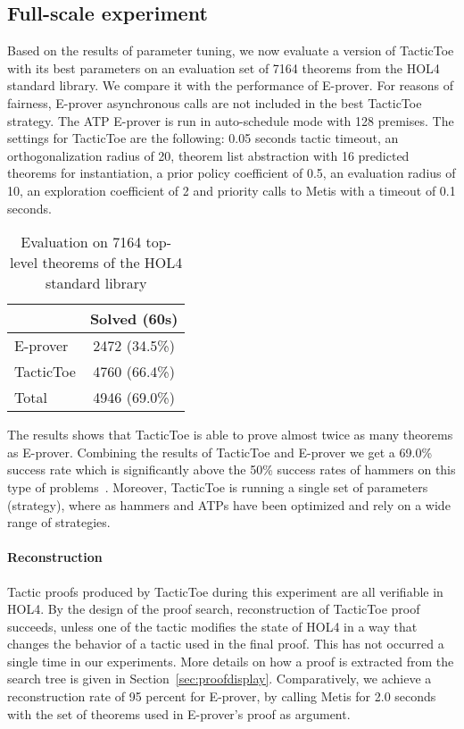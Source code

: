 \documentclass[runningheads,a4paper,draft]{svjour3}
\def\holfour{\textsf{HOL4}\xspace}
\def\eprover{\textsf{E-prover}\xspace}
\def\metis{\textsf{Metis}\xspace}
\def\tactictoe{\textsf{TacticToe}\xspace}
\newcommand{\ra}[1]{\renewcommand{\arraystretch}{#1}}
\begin{document}
\subsection{Full-scale experiment}\label{sec:full_exp}

Based on the results of parameter tuning, we now evaluate a version of
\tactictoe with its best parameters on an evaluation set of 7164 theorems from
the \holfour standard library. We compare it with the performance of \eprover.
For reasons of fairness, \eprover asynchronous calls are not included in the
best \tactictoe strategy. The ATP \eprover is run in auto-schedule mode with
128 premises. The settings for \tactictoe are the following:
0.05 seconds tactic timeout, an orthogonalization radius of 20, theorem list
abstraction with 16 predicted theorems for instantiation, a prior policy
coefficient of 0.5, an evaluation radius of 10, an exploration coefficient of 2
and priority calls to \metis with a timeout of 0.1 seconds.

\begin{table}[h!]
\centering\ra{1.3}
\small
\begin{tabular}{lc}
\toprule
  & Solved (60s) \\
\midrule
   \eprover   & 2472 (34.5\%)\\
   \tactictoe & 4760 (66.4\%)\\
\midrule
   Total  & 4946 (69.0\%)\\
\bottomrule
\end{tabular}
\caption{Evaluation on 7164 top-level theorems of the \holfour standard library
\label{tab:_param}}
\end{table}

The results shows that \tactictoe is able to prove almost twice as many
theorems as \eprover. Combining the results of \tactictoe and \eprover we get a
69.0\% success rate which is significantly above the 50\% success rates
of hammers on this type of problems~\cite{tgck-cpp15}. Moreover, \tactictoe is
running a single set of parameters (strategy), where as hammers and ATPs have
been optimized and rely on a wide range of strategies.


\paragraph{Reconstruction}
Tactic proofs produced by \tactictoe during this experiment are all verifiable
in \holfour. By the design of the proof search, reconstruction of \tactictoe
proof succeeds, unless one of the tactic modifies the state of \holfour in a
way that changes the behavior of a tactic used in the final proof. This has not
occurred a single time in our experiments.
More details on how a proof is extracted from the search tree is given in
Section~\ref{sec:proofdisplay}.
Comparatively, we achieve a reconstruction rate of 95 percent for \eprover,
by calling \metis for 2.0 seconds with the set of theorems used
in \eprover's proof as argument.
\end{document}
